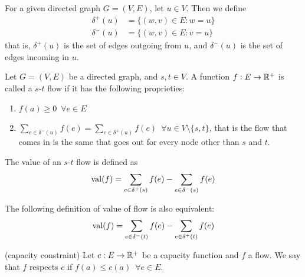 \documentclass[14pt]{extarticle}
\begin{document}
\begin{definition}
    For a given directed graph $G = (V, E)$, let $u \in V$. Then we define
    \begin{align}
        \delta^+(u) & = \{(w, v) \in E : w = u\} \label{eq:flow:delta_plus}  \\
        \delta^-(u) & = \{(w, v) \in E : v = u\} \label{eq:flow:delta_minus}
    \end{align}
    that is, $\delta^+(u)$ is the set of edges outgoing from $u$, and $\delta^-(u)$ is the set of edges incoming in $u$.
\end{definition}

\begin{definition}[flow]
    \label{def:flow:flow}
    Let $G = (V, E)$ be a directed graph, and $s,t \in V$.
    A function $f:E \to \mathbb{R}^+$ is called a $s$-$t$ flow if it has the following proprieties:
    \begin{enumerate}[label=\roman*.]
        \item $f(a) \geq 0 \enspace \forall e \in E$
        \item $\sum_{e \in \delta^-(u)} f(e) = \sum_{e \in \delta^+(u)} f(e) \enspace \forall u \in V \setminus \{ s, t \}$, that is the flow that comes in is the same that goes out for every node other than $s$ and $t$.
    \end{enumerate}
\end{definition}

\begin{definition}
    The value of an $s$-$t$ flow is defined as \begin{equation}
        {\operatorfont val} (f) = \sum_{e \in \delta^+(s)} f(e) - \sum_{e \in \delta^-(s)} f(e)
    \end{equation}
\end{definition}

\begin{remark}
    The following definition of value of flow is also equivalent:
    \begin{equation}
        {\operatorfont val} (f) = \sum_{e \in \delta^-(t)} f(e) - \sum_{e \in \delta^+(t)} f(e)
    \end{equation}
\end{remark}

\begin{definition}(capacity constraint)
    \label{def:flow:capacity_constraint}
    Let $c: E \to \mathbb{R}^+$ be a capacity function and $f$ a flow.
    We say that $f$ respects $c$ if $f(a)\leq c(a) \enspace \forall e \in E$.
\end{definition}
\end{document}
